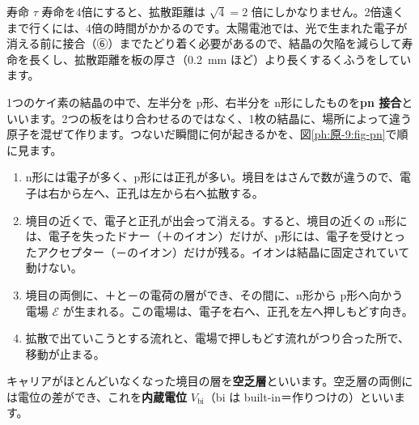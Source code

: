 \begin{phbaisuru}[4倍]{寿命 $\tau$}
寿命を4倍にすると、拡散距離は $\sqrt4=2$ 倍にしかなりません。2倍遠くまで行くには、4倍の時間がかかるのです。太陽電池では、光で生まれた電子が消える前に接合（⑥）までたどり着く必要があるので、結晶の欠陥を減らして寿命を長くし、拡散距離を板の厚さ（\qty{0.2}{mm} ほど）より長くするくふうをしています。
\end{phbaisuru}

\label{ph:原-9:sec6}
1つのケイ素の結晶の中で、左半分を p形、右半分を n形にしたものを\textbf{pn 接合}といいます。2つの板をはり合わせるのではなく、1枚の結晶に、場所によって違う原子を混ぜて作ります。つないだ瞬間に何が起きるかを、図\ref{ph:原-9:fig-pn}で順に見ます。

\begin{enumerate}[label={\bkcircled{\arabic*}}, leftmargin=2.4\zw, itemsep=1pt, topsep=2pt]
\item n形には電子が多く、p形には正孔が多い。境目をはさんで数が違うので、電子は右から左へ、正孔は左から右へ拡散する。
\item 境目の近くで、電子と正孔が出会って消える。すると、境目の近くの n形には、電子を失ったドナー（＋のイオン）だけが、p形には、電子を受けとったアクセプター（－のイオン）だけが残る。イオンは結晶に固定されていて動けない。
\item 境目の両側に、＋と－の電荷の層ができ、その間に、n形から p形へ向かう電場 $\mathcal E$ が生まれる。この電場は、電子を右へ、正孔を左へ押しもどす向き。
\item 拡散で出ていこうとする流れと、電場で押しもどす流れがつり合った所で、移動が止まる。
\end{enumerate}
キャリアがほとんどいなくなった境目の層を\textbf{空乏層}といいます。空乏層の両側には電位の差ができ、これを\textbf{内蔵電位} $V_{\mathrm{bi}}$（bi は built-in＝作りつけの）といいます。

